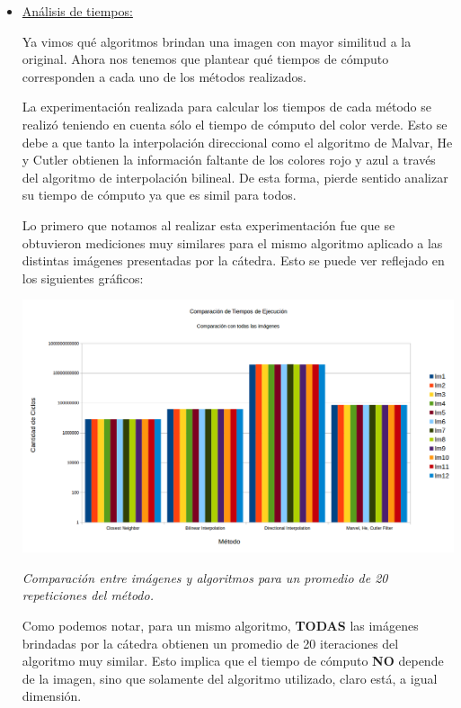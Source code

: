 \begin{itemize}
\item \underline{Análisis de tiempos:}

Ya vimos qué algoritmos brindan una imagen con mayor similitud a la original. Ahora nos tenemos que plantear qué tiempos de cómputo corresponden a cada uno de los métodos realizados. 

La experimentación realizada para calcular los tiempos de cada método se realizó teniendo en cuenta sólo el tiempo de cómputo del color verde. Esto se debe a que tanto la interpolación direccional como el algoritmo de Malvar, He y Cutler obtienen la información faltante de los colores rojo y azul a través del algoritmo de interpolación bilineal. De esta forma, pierde sentido analizar su tiempo de cómputo ya que es simil para todos.

Lo primero que notamos al realizar esta experimentación fue que se obtuvieron mediciones muy similares para el mismo algoritmo aplicado a las distintas imágenes presentadas por la cátedra. Esto se puede ver reflejado en los siguientes gráficos:

	\begin{center}
		\includegraphics[scale=0.4]{./img/comparacionMetodoImagen.png}
		\vspace{2pt}
		\par
		\footnotesize\textit{Comparación entre imágenes y algoritmos para un promedio de 20 repeticiones del método.}
	\end{center}

Como podemos notar, para un mismo algoritmo, \textbf{TODAS} las imágenes brindadas por la cátedra obtienen un promedio de 20 iteraciones del algoritmo muy similar. Esto implica que el tiempo de cómputo \textbf{NO} depende de la imagen, sino que solamente del algoritmo utilizado, claro está, a igual dimensión. 


\end{itemize}

